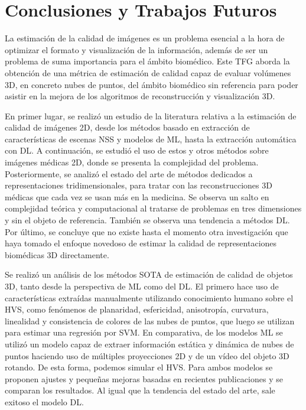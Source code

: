 \chapter{Conclusiones y Trabajos Futuros}
La estimación de la calidad de imágenes es un problema esencial a la hora 
de optimizar el formato y visualización de la información, además de ser 
un problema de suma importancia para el ámbito biomédico. Este TFG aborda 
la obtención de una métrica de estimación de calidad capaz de evaluar volúmenes 
3D, en concreto nubes de puntos, del ámbito biomédico sin referencia para poder asistir 
en la mejora de los algoritmos de reconstrucción y visualización 3D. 

En primer lugar, se realizó un estudio de la literatura relativa a la estimación 
de calidad de imágenes 2D, desde los métodos basado en extracción de características 
de escenas NSS y modelos de ML, hasta la extracción automática con DL. 
A continuación, se estudió el uso de estos y otros métodos sobre imágenes médicas 2D, 
donde se presenta la complejidad del problema. Posteriormente, se analizó el estado 
del arte de métodos dedicados a representaciones tridimensionales, para tratar con 
las reconstrucciones 3D médicas que cada vez se usan más en la medicina. 
Se observa un salto en complejidad teórica y computacional al tratarse de problemas 
en tres dimensiones y sin el objeto de referencia. 
También se observa una tendencia a métodos DL.
Por último, se concluye que no existe hasta el momento 
otra investigación que haya tomado el enfoque novedoso de estimar la calidad de 
representaciones biomédicas 3D directamente. 

Se realizó un análisis de los métodos SOTA de estimación de calidad de objetos 
3D, tanto desde la perspectiva de ML como del DL. El primero hace uso de características 
extraídas manualmente utilizando conocimiento humano sobre el HVS, como fenómenos 
de planaridad, esfericidad, anisotropía, curvatura, linealidad y consistencia de 
colores de las nubes de puntos, que luego se utilizan para estimar una regresión por 
SVM. En comparativa, de los modelos ML se utilizó un modelo capaz de extraer 
información estática y dinámica de nubes de puntos haciendo uso de múltiples 
proyecciones 2D y de un vídeo del objeto 3D rotando. De esta forma, podemos 
simular el HVS. Para ambos modelos se proponen ajustes y pequeñas mejoras basadas 
en recientes publicaciones y se comparan los resultados. 
Al igual que la tendencia del estado del arte, sale exitoso el modelo DL. 

